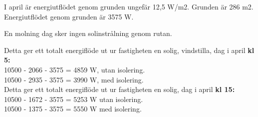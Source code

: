 I april är energiutflödet genom grunden ungefär 12,5 W/m2. Grunden är 286 m2.\\
Energiutflödet genom grunden är 3575 W.

En molning dag sker ingen solinstrålning genom rutan.

Detta ger ett totalt energiflöde ut ur fastigheten en solig, vindstilla, dag i april \textbf{kl 5:}\\
10500 - 2066 - 3575 =  4859 W, utan isolering.\\
10500 - 2935 - 3575 =  3990 W, med isolering.\\

Detta ger ett totalt energiflöde ut ur fastigheten en solig, dag i april \textbf{kl 15:}\\
10500 - 1672 - 3575 = 5253 W utan isolering.\\
10500 - 1375 - 3575  =  5550 W med isolering.\\


